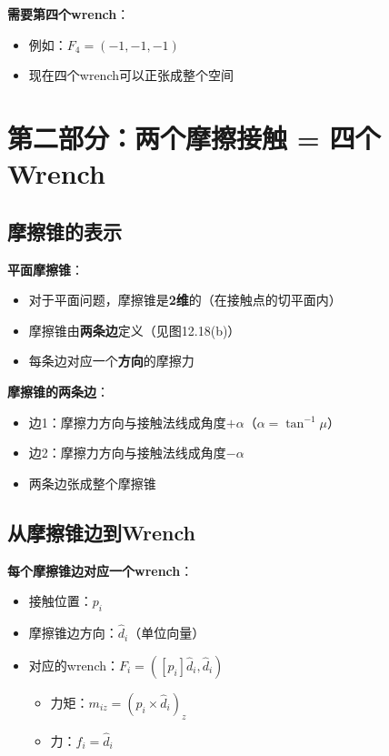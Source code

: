 \documentclass[12pt,a4paper]{article}
\begin{document}
\textbf{需要第四个wrench}：
\begin{itemize}
\item 例如：$F_4 = (-1, -1, -1)$
\item 现在四个wrench可以正张成整个空间
\end{itemize}

\section{第二部分：两个摩擦接触 = 四个Wrench}

\subsection{摩擦锥的表示}

\textbf{平面摩擦锥}：
\begin{itemize}
\item 对于平面问题，摩擦锥是\textbf{2维}的（在接触点的切平面内）
\item 摩擦锥由\textbf{两条边}定义（见图12.18(b)）
\item 每条边对应一个\textbf{方向}的摩擦力
\end{itemize}

\textbf{摩擦锥的两条边}：
\begin{itemize}
\item 边1：摩擦力方向与接触法线成角度$+\alpha$（$\alpha = \tan^{-1}\mu$）
\item 边2：摩擦力方向与接触法线成角度$-\alpha$
\item 两条边张成整个摩擦锥
\end{itemize}

\subsection{从摩擦锥边到Wrench}

\textbf{每个摩擦锥边对应一个wrench}：
\begin{itemize}
\item 接触位置：$p_i$
\item 摩擦锥边方向：$\hat{d}_i$（单位向量）
\item 对应的wrench：$F_i = ([p_i] \hat{d}_i, \hat{d}_i)$
   \begin{itemize}
   \item 力矩：$m_{iz} = (p_i \times \hat{d}_i)_z$
   \item 力：$f_i = \hat{d}_i$
   \end{itemize}
\end{itemize}
\end{document}
